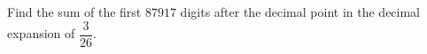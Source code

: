 Find the sum of the first $87917$ digits after the decimal point in the decimal expansion of $\dfrac{3}{26}$.
